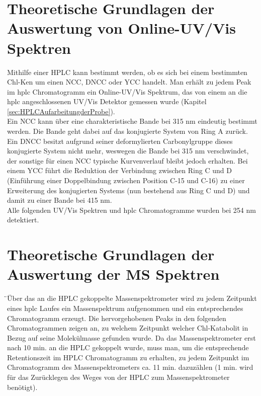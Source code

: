 \section{Theoretische Grundlagen der Auswertung von Online-UV/Vis Spektren} \label{sec:IdentifikationUVVis}

Mithilfe einer HPLC kann bestimmt werden, ob es sich bei einem bestimmten \gls{Chl-K}en um einen \gls{NCC}, \gls{DNCC} oder \gls{YCC} handelt. Man erhält zu jedem Peak im \gls{hplc} Chromatogramm ein Online-UV/Vis Spektrum, das von einem an die \gls{hplc} angeschlossenen UV/Vis Detektor gemessen wurde (Kapitel \ref{sec:HPLCAufarbeitungderProbe}). \\

Ein \gls{NCC} kann über eine charakteristische Bande bei 315 nm eindeutig bestimmt werden. Die Bande geht dabei auf das konjugierte System von Ring A zurück. Ein \gls{DNCC} besitzt aufgrund seiner deformylierten Carbonylgruppe dieses konjugierte System nicht mehr, weswegen die Bande bei 315 nm verschwindet, der sonstige für einen \gls{NCC} typische Kurvenverlauf bleibt jedoch erhalten. Bei einem \gls{YCC} führt die Reduktion der Verbindung zwischen Ring C und D (Einführung einer Doppelbindung zwischen Position C-15 und C-16) zu einer Erweiterung des konjugierten Systems (nun bestehend aus Ring C und D) und damit zu einer Bande bei 415 nm. \\

Alle folgenden UV/Vis Spektren und \gls{hplc} Chromatogramme wurden bei 254 nm detektiert.

\section{Theoretische Grundlagen der Auswertung der MS Spektren} \label{sec:IdentifikationMS}

̈Über das an die HPLC gekoppelte Massenspektrometer wird zu jedem Zeitpunkt eines \gls{hplc} Laufes ein Massenspektrum aufgenommen und ein entsprechendes Chromatogramm erzeugt. Die hervorgehobenen Peaks in den folgenden Chromatogrammen zeigen an, zu welchem Zeitpunkt welcher Chl-Katabolit in Bezug auf seine Molekülmasse gefunden wurde. Da das Massenspektrometer erst nach 10 min. an die HPLC gekoppelt wurde, muss man, um die entsprechende Retentionszeit im HPLC Chromatogramm zu erhalten, zu jedem Zeitpunkt im Chromatogramm des Massenspektrometers ca. 11 min. dazuzählen (1 min. wird für das Zurücklegen des Weges von der HPLC zum Massenspektrometer benötigt).  \\

